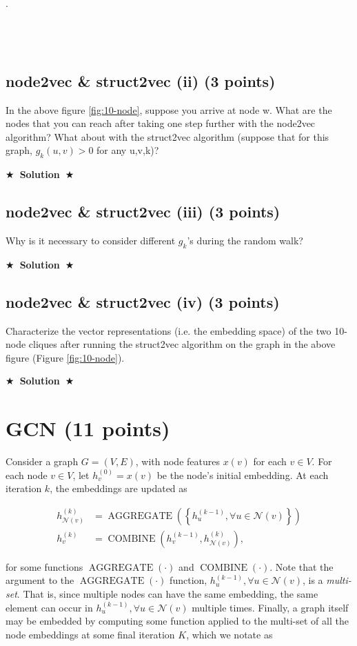 \documentclass{article}
\numberwithin{figure}{section}
\newcommand{\Solution}[1]{{\medskip \color{red} \bf $\bigstar$~\sf \textbf{Solution}~$\bigstar$ \sf #1 } \bigskip}
\begin{document}
.\\\\\\\\
\subsection{ node2vec \& struct2vec (ii) (3 points)}
In the above figure \ref{fig:10-node}, suppose you arrive at node w. What are the nodes that you can reach after taking one step further with the node2vec algorithm? What about with the struct2vec algorithm (suppose that for this graph, $g_k(u, v) > 0$ for any u,v,k)?

\Solution{}

\subsection{node2vec \& struct2vec (iii) (3 points)}
Why is it necessary to consider different $g_k$'s during the random walk?

\Solution{}

\subsection{node2vec \& struct2vec (iv) (3 points)}
Characterize the vector representations (i.e. the embedding space) of the two 10-node cliques after running the struct2vec algorithm on the graph in the above figure (Figure \ref{fig:10-node}).

\Solution{}


\section{GCN (11 points)}

Consider a graph $G = (V, E)$, with node features $x(v)$ for each $v \in V$. For each node $v \in V$, let $h^{(0)}_v = x(v)$ be the node’s initial embedding. At each iteration $k$, the embeddings are updated as 

$$
\begin{aligned}
h_{\mathcal{N}(v)}^{(k)} & =\operatorname{AGGREGATE}\left(\left\{h_u^{(k-1)}, \forall u \in \mathcal{N}(v)\right\}\right) \\
h_v^{(k)} & =\operatorname{COMBINE}\left(h_v^{(k-1)}, h_{\mathcal{N}(v)}^{(k)}\right),
\end{aligned}
$$

\noindent for some functions $\operatorname{AGGREGATE}(\cdot)$ and $\operatorname{COMBINE}(\cdot)$. Note that the argument to the $\operatorname{AGGREGATE}(\cdot)$ function, ${h^{(k-1)}_u, \forall u \in \mathcal{N}(v)}$, is a \textit{multi-set}.
That is, since multiple nodes can have the same embedding, the same element can occur in ${h^{(k-1)}_u, \forall u \in \mathcal{N}(v)}$ multiple times.
Finally, a graph itself may be embedded by computing some function applied to the multi-set of all the node embeddings at some final iteration $K$, which we notate as 
\end{document}
